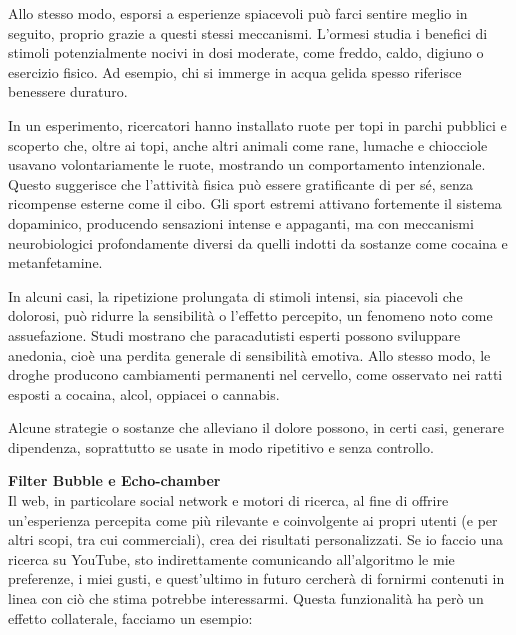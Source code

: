 \documentclass[12pt]{book} %
\begin{document}
\begin{mdframed}[linewidth=1pt]
Allo stesso modo, esporsi a esperienze spiacevoli può farci sentire meglio in seguito, proprio grazie a questi stessi meccanismi. L’ormesi studia i benefici di stimoli potenzialmente nocivi in dosi moderate, come freddo, caldo, digiuno o esercizio fisico. Ad esempio, chi si immerge in acqua gelida spesso riferisce benessere duraturo.

In un esperimento, ricercatori hanno installato ruote per topi in parchi pubblici e scoperto che, oltre ai topi, anche altri animali come rane, lumache e chiocciole usavano volontariamente le ruote, mostrando un comportamento intenzionale. Questo suggerisce che l’attività fisica può essere gratificante di per sé, senza ricompense esterne come il cibo. Gli sport estremi attivano fortemente il sistema dopaminico, producendo sensazioni intense e appaganti, ma con meccanismi neurobiologici profondamente diversi da quelli indotti da sostanze come cocaina e metanfetamine.

In alcuni casi, la ripetizione prolungata di stimoli intensi, sia piacevoli che dolorosi, può ridurre la sensibilità o l’effetto percepito, un fenomeno noto come assuefazione. Studi mostrano che paracadutisti esperti possono sviluppare anedonia, cioè una perdita generale di sensibilità emotiva. Allo stesso modo, le droghe producono cambiamenti permanenti nel cervello, come osservato nei ratti esposti a cocaina, alcol, oppiacei o cannabis.

Alcune strategie o sostanze che alleviano il dolore possono, in certi casi, generare dipendenza, soprattutto se usate in modo ripetitivo e senza controllo.
\end{mdframed}

\noindent \textbf{\large Filter Bubble e Echo-chamber} \\
Il web, in particolare social network e motori di ricerca, al fine di offrire un'esperienza percepita come più rilevante e coinvolgente ai propri utenti (e per altri scopi, tra cui commerciali), crea dei risultati personalizzati. Se io faccio una ricerca su YouTube, sto indirettamente comunicando
all'algoritmo le mie preferenze, i miei gusti, e quest'ultimo in futuro
cercherà di fornirmi contenuti in linea con ciò che stima potrebbe interessarmi. Questa funzionalità ha però un effetto
collaterale, facciamo un esempio:
\end{document}
